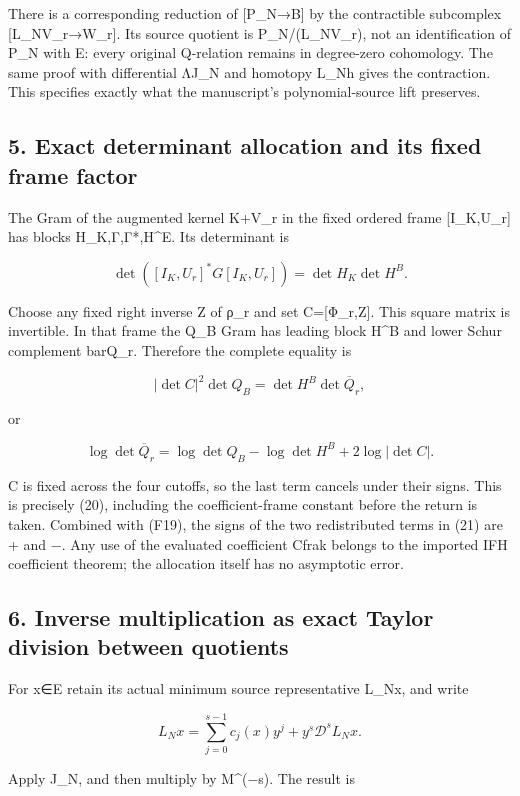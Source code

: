 There is a corresponding reduction of {[}P\_N→B{]} by the contractible subcomplex {[}L\_NV\_r→W\_r{]}. Its source quotient is P\_N/(L\_NV\_r), not an identification of P\_N with E: every original Q-relation remains in degree-zero cohomology. The same proof with differential ΛJ\_N and homotopy L\_Nh gives the contraction. This specifies exactly what the manuscript's polynomial-source lift preserves.

\subsection{5. Exact determinant allocation and its fixed frame factor}\label{exact-determinant-allocation-and-its-fixed-frame-factor}

The Gram of the augmented kernel K+V\_r in the fixed ordered frame {[}I\_K,U\_r{]} has blocks H\_K,Γ,Γ*,H\^{}E. Its determinant is

\[
\det([I_K,U_r]^*G[I_K,U_r])=\det H_K\det H^B. \tag{F19}
\]

Choose any fixed right inverse Z of ρ\_r and set C={[}Φ\_r,Z{]}. This square matrix is invertible. In that frame the Q\_B Gram has leading block H\^{}B and lower Schur complement barQ\_r. Therefore the complete equality is

\[
|\det C|^2\det Q_B=\det H^B\det\overline Q_r,
\]

or

\[
\log\det\overline Q_r
=\log\det Q_B-\log\det H^B+2\log|\det C|. \tag{F20}
\]

C is fixed across the four cutoffs, so the last term cancels under their signs. This is precisely (20), including the coefficient-frame constant before the return is taken. Combined with (F19), the signs of the two redistributed terms in (21) are + and −. Any use of the evaluated coefficient Cfrak belongs to the imported IFH coefficient theorem; the allocation itself has no asymptotic error.

\subsection{6. Inverse multiplication as exact Taylor division between quotients}\label{inverse-multiplication-as-exact-taylor-division-between-quotients}

For x∈E retain its actual minimum source representative L\_Nx, and write

\[
L_Nx=\sum_{j=0}^{s-1}c_j(x)y^j+y^s\mathscr D^sL_Nx.
\]

Apply J\_N, and then multiply by M\^{}(−s). The result is

